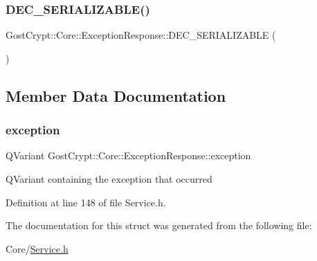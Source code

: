 \subsubsection{\texorpdfstring{D\+E\+C\+\_\+\+S\+E\+R\+I\+A\+L\+I\+Z\+A\+B\+L\+E()}{DEC\_SERIALIZABLE()}}
{\footnotesize\ttfamily Gost\+Crypt\+::\+Core\+::\+Exception\+Response\+::\+D\+E\+C\+\_\+\+S\+E\+R\+I\+A\+L\+I\+Z\+A\+B\+LE (\begin{DoxyParamCaption}\item[{\hyperlink{struct_gost_crypt_1_1_core_1_1_exception_response}{Exception\+Response}}]{ }\end{DoxyParamCaption})}



\subsection{Member Data Documentation}
\mbox{\label{struct_gost_crypt_1_1_core_1_1_exception_response_a93e66ad6ada02d1dce6ffadae38bb81b}} 
\subsubsection{\texorpdfstring{exception}{exception}}
{\footnotesize\ttfamily Q\+Variant Gost\+Crypt\+::\+Core\+::\+Exception\+Response\+::exception}

Q\+Variant containing the exception that occurred 

Definition at line 148 of file Service.\+h.



The documentation for this struct was generated from the following file\+:\begin{DoxyCompactItemize}
\item 
Core/\hyperlink{_service_8h}{Service.\+h}\end{DoxyCompactItemize}
